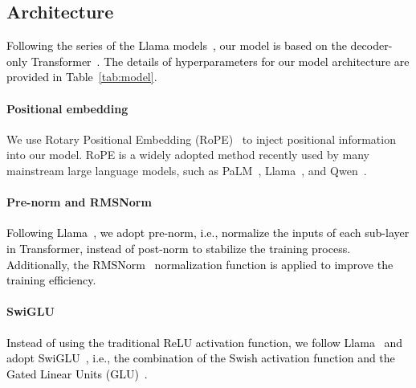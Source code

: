 \documentclass{article}
\begin{document}
\subsection{Architecture}
\textcolor{black}{
    Following the series of the Llama models~\citep{touvron2023llama,touvron2023llama2},
        our model is based on the decoder-only Transformer~\citep{vaswani2017transformer}.
    The details of hyperparameters for our model architecture are provided in Table~\ref{tab:model}.
}
\vspace{-10pt}
\begin{table}[htbp]
  \centering
  \normalsize
  \caption{
    The details of model architecture.
  }
  \label{tab:model}
\end{table}
\vspace{-1pt}
\paragraph{Positional embedding}
We use Rotary Positional Embedding (RoPE)~\citep{su2021roformer} to inject positional information into our model.
RoPE is a widely adopted method recently used by many mainstream large language models, such as PaLM~\citep{anil2023palm}, Llama~\citep{touvron2023llama,touvron2023llama2}, and Qwen~\citep{bai2023qwen}.
\vspace{-1em}
\paragraph{Pre-norm and RMSNorm}
\textcolor{black}{
Following Llama~\citep{touvron2023llama,touvron2023llama2},
    we adopt pre-norm, i.e., normalize the inputs of each sub-layer in Transformer,
    instead of post-norm to stabilize the training process.
Additionally, the RMSNorm~\citep{DBLP:conf/nips/ZhangS19a} normalization function is applied to improve the training efficiency.
}
\vspace{-1em}
\paragraph{SwiGLU}
\textcolor{black}{
Instead of using the traditional ReLU activation function,
    we follow Llama~\citep{touvron2023llama,touvron2023llama2} and adopt SwiGLU~\citep{DBLP:journals/corr/abs-2002-05202},
    i.e., the combination of the Swish activation function and the Gated Linear Units (GLU)~\citep{dauphin2017glu}.
}
\vspace{-1em}
\end{document}
